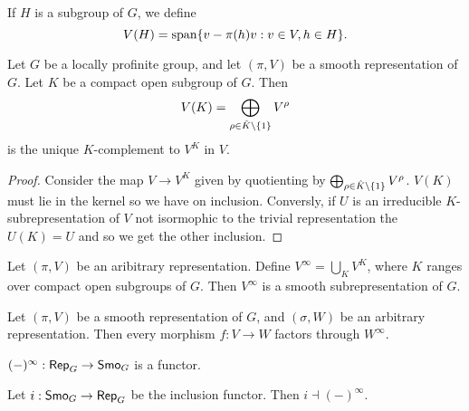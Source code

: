 \documentclass{memoir}
\begin{document}
\begin{definition}
    If $H$ is a subgroup of $G$, we define 
    \begin{equation}
        V(H) = \text{span}\lbrace v-\pi(h)v:v\in V,h\in H\rbrace.
    \end{equation}
\end{definition}
\begin{corollary}
    Let $G$ be a locally profinite group, and let $(\pi, V)$ be a smooth representation of $G$.
    Let $K$ be a compact open subgroup of $G$.
    Then
    \begin{equation}
        V(K) = \bigoplus_{\rho\in \hat K\backslash\lbrace1\rbrace}V^\rho
    \end{equation}
    is the unique $K$-complement to $V^K$ in $V$.
\end{corollary}
\begin{proof}
    Consider the map $V\to V^K$ given by quotienting by $\bigoplus_{\rho\in \hat K\backslash\lbrace1\rbrace}V^\rho$.
    $V(K)$ must lie in the kernel so we have on inclusion.
    Conversly, if $U$ is an irreducible $K$-subrepresentation of $V$ not isormophic to the trivial representation the $U(K) = U$ and so we get the other inclusion.
\end{proof}
\begin{proposition}
    Let $(\pi,V)$ be an aribitrary representation.
    Define $V^\infty = \bigcup_KV^K$, where $K$ ranges over compact open subgroups of $G$.
    Then $V^\infty$ is a smooth subrepresentation of $G$.
\end{proposition}
\begin{proposition}
    Let $(\pi,V)$ be a smooth representation of $G$, and $(\sigma,W)$ be an arbitrary representation.
    Then every morphism $f:V\to W$ factors through $W^\infty$.
\end{proposition}
\begin{corollary}
    $(-)^\infty:{\normalfont\mathsf{Rep}}_G\to {\normalfont\mathsf{Smo}}_G$ is a functor.
\end{corollary}
\begin{thm}
    Let $i:{\normalfont\mathsf{Smo}}_G\to {\normalfont\mathsf{Rep}}_G$ be the inclusion functor.
    Then $i\dashv (-)^\infty$.
\end{thm}
\end{document}
